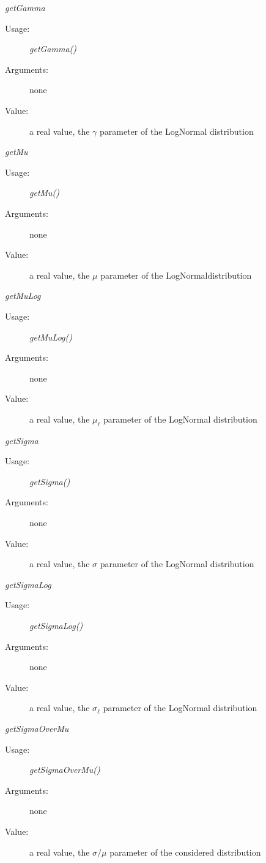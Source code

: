 \begin{description}
\begin{description}
\item \textit{getGamma}
\begin{description}
\item[Usage:] \textit{getGamma()}
\item[Arguments:] none
\item[Value:]  a real value, the $\gamma$ parameter of the LogNormal distribution
\end{description}
\bigskip
\item \textit{getMu}
\begin{description}
\item[Usage:] \textit{getMu()}
\item[Arguments:] none
\item[Value:]  a real value,  the $\mu$ parameter of the  LogNormaldistribution
\end{description}
\bigskip
\item \textit{getMuLog}
\begin{description}
\item[Usage:] \textit{getMuLog()}
\item[Arguments:] none
\item[Value:]  a real value,  the $\mu_\ell$ parameter of the LogNormal distribution
\end{description}
\bigskip
\item \textit{getSigma}
\begin{description}
\item[Usage:] \textit{getSigma()}
\item[Arguments:] none
\item[Value:]  a real value,  the $\sigma$ parameter of the LogNormal distribution
\end{description}
\bigskip
\item \textit{getSigmaLog}
\begin{description}
\item[Usage:] \textit{getSigmaLog()}
\item[Arguments:] none
\item[Value:]  a real value,  the $\sigma_\ell$ parameter of the  LogNormal distribution
\end{description}
\bigskip

\item \textit{getSigmaOverMu}
\begin{description}
\item[Usage:] \textit{getSigmaOverMu()}
\item[Arguments:] none
\item[Value:]  a real value, the  $\sigma/\mu$ parameter of the considered distribution
\end{description}
\end{description}


\end{description}
